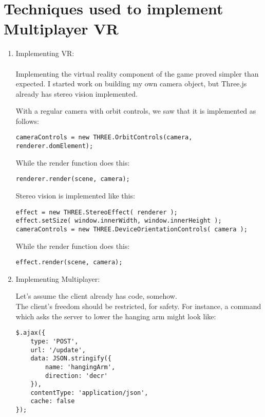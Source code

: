 \documentclass{article}
\begin{document}

\section{Techniques used to implement Multiplayer VR}

\begin{enumerate}
 	\item Implementing VR: \\ \\
 		Implementing the virtual reality component of the game proved simpler than expected.  I started work on building my own camera object, but Three.js already has stereo vision implemented.

		With a regular camera with orbit controls, we saw that it is implemented as follows:
 		\begin{lstlisting}
cameraControls = new THREE.OrbitControls(camera, renderer.domElement);
 		\end{lstlisting}
 		
 		While the render function does this:
 		\begin{lstlisting}
renderer.render(scene, camera);
 		\end{lstlisting}
 		
 		Stereo vision is implemented like this:
 		\begin{lstlisting}
effect = new THREE.StereoEffect( renderer );
effect.setSize( window.innerWidth, window.innerHeight );
cameraControls = new THREE.DeviceOrientationControls( camera );
 		\end{lstlisting}
 		
 		While the render function does this:
 		\begin{lstlisting}
effect.render(scene, camera);
 		\end{lstlisting}
 	\item Implementing Multiplayer:
 	
 		Let's assume the client already has code, somehow. \\
 		
 		The client's freedom should be restricted, for safety.  For instance, a command which asks the server to lower the hanging arm might look like:

		\begin{lstlisting}
$.ajax({
	type: 'POST',
	url: '/update',
	data: JSON.stringify({
		name: 'hangingArm',
		direction: 'decr'
	}),
	contentType: 'application/json',
	cache: false
});
 		\end{lstlisting}


\end{enumerate}
\end{document}
